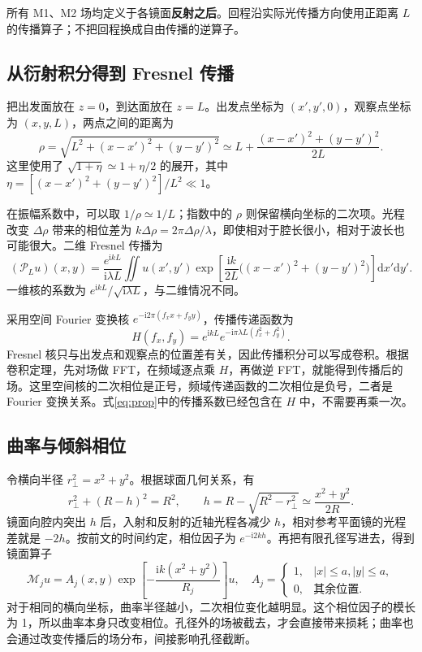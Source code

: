 \documentclass[UTF8,a4paper,11pt,fontset=fandol]{ctexart}
\newcommand{\dd}{\mathrm{d}}
\newcommand{\ii}{\mathrm{i}}
\begin{document}
所有 M1、M2 场均定义于各镜面\textbf{反射之后}。回程沿实际光传播方向使用正距离 $L$ 的传播算子；不把回程换成自由传播的逆算子。

\subsection{从衍射积分得到 Fresnel 传播}
把出发面放在 $z=0$，到达面放在 $z=L$。出发点坐标为 $(x',y',0)$，观察点坐标为 $(x,y,L)$，两点之间的距离为
\begin{equation}
 \rho=\sqrt{L^2+(x-x')^2+(y-y')^2}
 \simeq L+\frac{(x-x')^2+(y-y')^2}{2L}.
\end{equation}
这里使用了 $\sqrt{1+\eta}\simeq1+\eta/2$ 的展开，其中 $\eta=[(x-x')^2+(y-y')^2]/L^2\ll1$。

在振幅系数中，可以取 $1/\rho\simeq1/L$；指数中的 $\rho$ 则保留横向坐标的二次项。光程改变 $\Delta\rho$ 带来的相位差为 $k\Delta\rho=2\pi\Delta\rho/\lambda$，即使相对于腔长很小，相对于波长也可能很大。二维 Fresnel 传播为\cite{kogelnik}
\begin{equation}\label{eq:prop}
 (\mathcal P_Lu)(x,y)=\frac{e^{\ii kL}}{\ii\lambda L}
 \iint u(x',y')\exp\!\left[\frac{\ii k}{2L}\big((x-x')^2+(y-y')^2\big)\right]\dd x'\dd y'.
\end{equation}
一维核的系数为 $e^{\ii kL}/\sqrt{\ii\lambda L}$，与二维情况不同。

采用空间 Fourier 变换核 $e^{-\ii2\pi(f_xx+f_yy)}$，传播传递函数为
\begin{equation}\label{eq:transfer}
 H(f_x,f_y)=e^{\ii kL}e^{-\ii\pi\lambda L(f_x^2+f_y^2)}.
\end{equation}
Fresnel 核只与出发点和观察点的位置差有关，因此传播积分可以写成卷积。根据卷积定理，先对场做 FFT，在频域逐点乘 $H$，再做逆 FFT，就能得到传播后的场\cite{johnson}。这里空间核的二次相位是正号，频域传递函数的二次相位是负号，二者是 Fourier 变换关系。式\eqref{eq:prop}中的传播系数已经包含在 $H$ 中，不需要再乘一次。

\subsection{曲率与倾斜相位}
令横向半径 $r_\perp^2=x^2+y^2$。根据球面几何关系，有
\begin{equation}
 r_\perp^2+(R-h)^2=R^2,\qquad
 h=R-\sqrt{R^2-r_\perp^2}\simeq\frac{x^2+y^2}{2R}.
\end{equation}
镜面向腔内突出 $h$ 后，入射和反射的近轴光程各减少 $h$，相对参考平面镜的光程差就是 $-2h$。按前文的时间约定，相位因子为 $e^{-\ii2kh}$。再把有限孔径写进去，得到镜面算子
\begin{equation}\label{eq:mirror}
 \mathcal M_j u=A_j(x,y)\exp\left[-\frac{\ii k(x^2+y^2)}{R_j}\right]u,
 \quad
 A_j=\begin{cases}1,&|x|\le a,|y|\le a,\\0,&\text{其余位置}.\end{cases}
\end{equation}
对于相同的横向坐标，曲率半径越小，二次相位变化越明显。这个相位因子的模长为 1，所以曲率本身只改变相位。孔径外的场被截去，才会直接带来损耗；曲率也会通过改变传播后的场分布，间接影响孔径截断。
\end{document}
